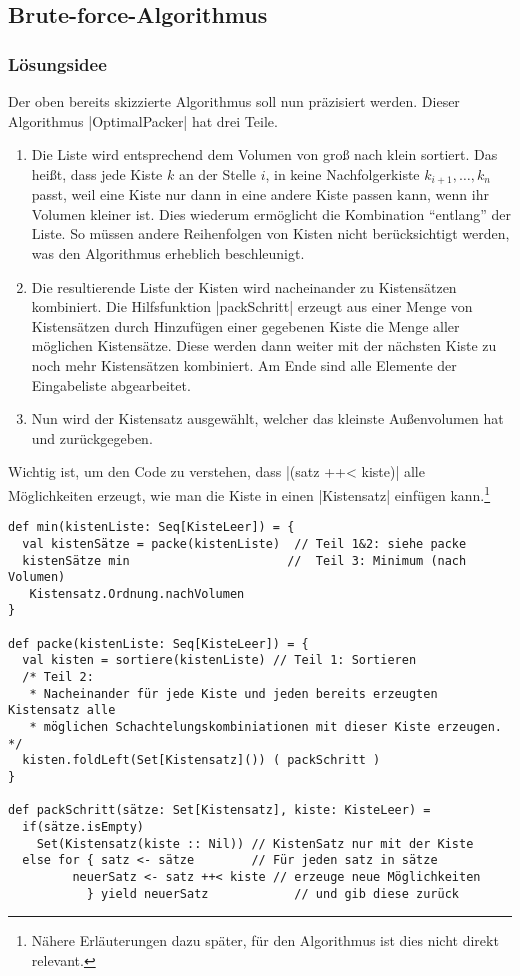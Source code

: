 \subsection{Brute-force-Algorithmus}
\label{bruteforce}
\subsubsection{Lösungsidee}
\lstset{basicstyle=\ttfamily}
 Der oben bereits skizzierte Algorithmus soll nun präzisiert werden.
 Dieser Algorithmus |OptimalPacker| hat drei Teile.
\begin{enumerate}
 \item Die Liste wird entsprechend dem Volumen von groß nach klein sortiert.
  Das heißt, dass jede Kiste $k$ an der Stelle $i$, in keine Nachfolgerkiste $k_{i+1}, \dots, k_n$ passt,
   weil eine Kiste nur dann in eine andere Kiste passen kann, wenn ihr Volumen kleiner ist.
  Dies wiederum ermöglicht die Kombination ``entlang'' der Liste.
  So müssen andere Reihenfolgen von Kisten nicht berücksichtigt werden, was den Algorithmus erheblich beschleunigt.
 \item Die resultierende Liste der Kisten wird nacheinander zu Kistensätzen kombiniert.
  Die Hilfsfunktion |packSchritt| erzeugt aus einer Menge von Kistensätzen durch Hinzufügen einer gegebenen Kiste die Menge aller möglichen Kistensätze.
  Diese werden dann weiter mit der nächsten Kiste zu noch mehr Kistensätzen kombiniert.
  Am Ende sind alle Elemente der Eingabeliste abgearbeitet.
 \item Nun wird der Kistensatz ausgewählt, welcher das kleinste Außenvolumen hat und zurückgegeben.
\end{enumerate}
 Wichtig ist, um den Code zu verstehen, dass |(satz ++< kiste)| alle Möglichkeiten erzeugt,
 wie man die Kiste in einen |Kistensatz| einfügen kann.\footnote{Nähere Erläuterungen dazu später, für den Algorithmus ist dies nicht direkt relevant.}

\lstset{basicstyle=\ttfamily\small}
\begin{lstlisting}
def min(kistenListe: Seq[KisteLeer]) = {
  val kistenSätze = packe(kistenListe)  // Teil 1&2: siehe packe
  kistenSätze min                      //  Teil 3: Minimum (nach Volumen)
   Kistensatz.Ordnung.nachVolumen
}

def packe(kistenListe: Seq[KisteLeer]) = {
  val kisten = sortiere(kistenListe) // Teil 1: Sortieren
  /* Teil 2:
   * Nacheinander für jede Kiste und jeden bereits erzeugten Kistensatz alle
   * möglichen Schachtelungskombiniationen mit dieser Kiste erzeugen. */
  kisten.foldLeft(Set[Kistensatz]()) ( packSchritt )
}

def packSchritt(sätze: Set[Kistensatz], kiste: KisteLeer) =
  if(sätze.isEmpty)
    Set(Kistensatz(kiste :: Nil)) // KistenSatz nur mit der Kiste
  else for { satz <- sätze 		  // Für jeden satz in sätze
	     neuerSatz <- satz ++< kiste // erzeuge neue Möglichkeiten
           } yield neuerSatz            // und gib diese zurück
\end{lstlisting}
\lstset{basicstyle=\ttfamily}
